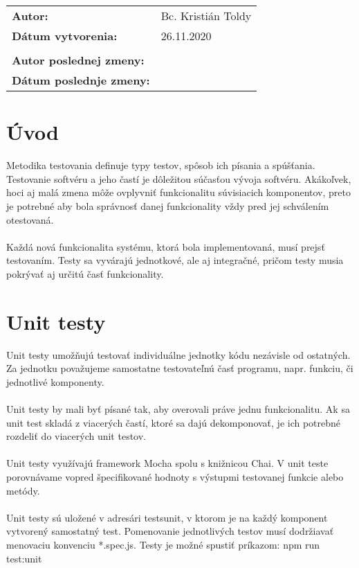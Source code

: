 \documentclass{article}
\begin{document}
    

    \begin{table}[h]
        \begin{tabular}{ll}
            \textbf{Autor:} & Bc. Kristián Toldy \\
            \textbf{Dátum vytvorenia:} & 26.11.2020 \\
            \\
            \textbf{Autor poslednej zmeny:} & \\
            \textbf{Dátum poslednje zmeny:} & \\
            \hline
        \end{tabular}
        \label{tab:grades}
    \end{table}

    \section*{Úvod}

        \textnormal{%
        Metodika testovania definuje typy testov, spôsob ich písania a spúšťania. Testovanie softvéru a jeho častí je dôležitou súčasťou vývoja softvéru. Akákoľvek, hoci aj malá zmena môže ovplyvniť funkcionalitu súvisiacich komponentov, preto je potrebné aby bola správnosť danej funkcionality vždy pred jej schválením otestovaná. \\\\
Každá nová funkcionalita systému, ktorá bola implementovaná, musí prejsť testovaním. Testy sa vyvárajú jednotkové, ale aj integračné, pričom testy musia pokrývať aj určitú časť funkcionality.
        }
		\section*{Unit testy}

        \textnormal{%
     Unit testy umožňujú testovať individuálne jednotky kódu nezávisle od ostatných. Za jednotku považujeme samostatne testovateľnú časť programu, napr. funkciu, či jednotlivé komponenty. \\\\
Unit testy by mali byť písané tak, aby overovali práve jednu funkcionalitu. Ak sa unit test skladá z viacerých častí, ktoré sa dajú dekomponovať, je ich potrebné rozdeliť do viacerých unit testov. \\\\
Unit testy využívajú framework Mocha spolu s knižnicou Chai. V unit teste porovnávame vopred špecifikované hodnoty s výstupmi testovanej funkcie alebo metódy. \\\\
Unit testy sú uložené v adresári \/tests\/unit, v ktorom je na každý komponent vytvorený samostatný test. Pomenovanie jednotlivých testov musí dodržiavať menovaciu konvenciu *.spec.js. 
Testy je možné spustiť príkazom:
npm run test:unit
        }
				
\end{document}
